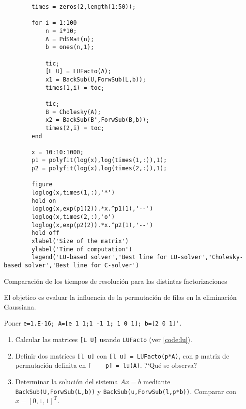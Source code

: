 \begin{listing}
    \begin{verbatim}
        times = zeros(2,length(1:50));

        for i = 1:100
            n = i*10;
            A = PdSMat(n);
            b = ones(n,1);
            
            tic;
            [L U] = LUFacto(A);
            x1 = BackSub(U,ForwSub(L,b));
            times(1,i) = toc;
            
            tic;
            B = Cholesky(A);
            x2 = BackSub(B',ForwSub(B,b));
            times(2,i) = toc;
        end

        x = 10:10:1000;
        p1 = polyfit(log(x),log(times(1,:)),1);
        p2 = polyfit(log(x),log(times(2,:)),1);

        figure
        loglog(x,times(1,:),'*')
        hold on
        loglog(x,exp(p1(2)).*x.^p1(1),'--')
        loglog(x,times(2,:),'o')
        loglog(x,exp(p2(2)).*x.^p2(1),'--')
        hold off
        xlabel('Size of the matrix')
        ylabel('Time of computation')
        legend('LU-based solver','Best line for LU-solver','Cholesky-based solver','Best line for C-solver')
    \end{verbatim}
    \caption{Comparaci\'on de los tiempos de resoluci\'on para las distintas factorizaciones}
    \label{code:solver-comp}
\end{listing}

\begin{problema}
    El objetico es evaluar la influencia de la permutaci\'on de filas en la eliminaci\'on Gaussiana.

    Poner \texttt{e=1.E-16; A=[e 1 1;1 -1 1; 1 0 1]; b=[2 0 1]'}.
    \begin{enumerate}
        \item Calcular las matrices \texttt{[L U]} usando \texttt{LUFacto} (ver \eqref{code:lu}).
        \item Definir dos matrices \texttt{[l u]} con \texttt{[l u] = LUFacto(p*A)}, con \texttt{p} matriz de permutaci\'on definita en \texttt{[~ ~ p] = lu(A)}. ?`Qu\'e se observa?
        \item Determinar la soluci\'on del sistema \(Ax=b\) mediante \texttt{BackSub(U,ForwSub(L,b))} y \texttt{BackSub(u,ForwSub(l,p*b))}. Comparar con \(x=[0,1,1]^\mathrm{T}\).
    \end{enumerate}
\end{problema}

